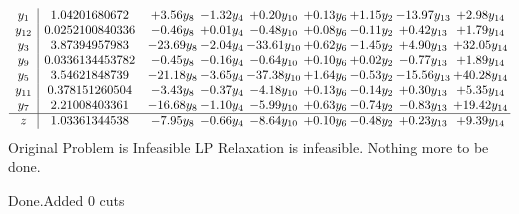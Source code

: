 \documentclass[8pt]{article}
\begin{document}
\[\begin{array}{c| c c@{\hskip 2pt} c@{\hskip 2pt} c@{\hskip 2pt} c@{\hskip 2pt} c@{\hskip 2pt} c@{\hskip 2pt} c@{\hskip 2pt} }
 y_{1}   &  1.04201680672 & +  3.56 y_{8} & -1.32 y_{4} & +  0.20 y_{10} & +  0.13 y_{6} & +  1.15 y_{2} & -13.97 y_{13} & +  2.98 y_{14}\\
 y_{12}   &  0.0252100840336 & -0.46 y_{8} & +  0.01 y_{4} & -0.48 y_{10} & +  0.08 y_{6} & -0.11 y_{2} & +  0.42 y_{13} & +  1.79 y_{14}\\
 y_{3}   &  3.87394957983 & -23.69 y_{8} & -2.04 y_{4} & -33.61 y_{10} & +  0.62 y_{6} & -1.45 y_{2} & +  4.90 y_{13} & + 32.05 y_{14}\\
 y_{9}   &  0.0336134453782 & -0.45 y_{8} & -0.16 y_{4} & -0.64 y_{10} & +  0.10 y_{6} & +  0.02 y_{2} & -0.77 y_{13} & +  1.89 y_{14}\\
 y_{5}   &  3.54621848739 & -21.18 y_{8} & -3.65 y_{4} & -37.38 y_{10} & +  1.64 y_{6} & -0.53 y_{2} & -15.56 y_{13} & + 40.28 y_{14}\\
 y_{11}   &  0.378151260504 & -3.43 y_{8} & -0.37 y_{4} & -4.18 y_{10} & +  0.13 y_{6} & -0.14 y_{2} & +  0.30 y_{13} & +  5.35 y_{14}\\
 y_{7}   &  2.21008403361 & -16.68 y_{8} & -1.10 y_{4} & -5.99 y_{10} & +  0.63 y_{6} & -0.74 y_{2} & -0.83 y_{13} & + 19.42 y_{14}\\
\hline
z    &  1.03361344538 & -7.95 y_{8} & -0.66 y_{4} & -8.64 y_{10} & +  0.10 y_{6} & -0.48 y_{2} & +  0.23 y_{13} & +  9.39 y_{14}\\
\end{array}\]
Original Problem is Infeasible
 LP Relaxation is infeasible. Nothing more to be done. 

Done.Added 0 cuts 
\end{document}
